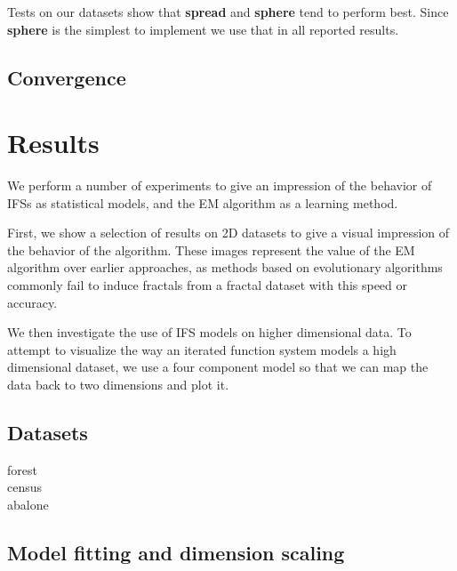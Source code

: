 \documentclass[10pt,a4paper,oneside]{article}
\theoremstyle{definition}
\begin{document}
Tests on our datasets show that \textbf{spread} and \textbf{sphere} tend to perform best. Since \textbf{sphere} is the simplest to implement  we use that in all reported results.
 
\subsection*{Convergence}

\section*{Results}

We perform a number of experiments to give an impression of the behavior of IFSs as statistical models, and the EM algorithm as a learning method. 

First, we show a selection of results on 2D datasets to give a visual impression of the behavior of the algorithm. These images represent the value of the EM algorithm over earlier approaches, as methods based on evolutionary algorithms commonly fail to induce fractals from a fractal dataset with this speed or accuracy.

We then investigate the use of IFS models on higher dimensional data. To attempt to visualize the way an iterated function system models a high dimensional dataset, we use a four component model so that we can map the data back to two dimensions and plot it.

\subsection*{Datasets}

\begin{description}
  \item[forest]
  \item[census]
  \item[abalone]
\end{description}

\subsection*{Model fitting and dimension scaling}
\end{document}
